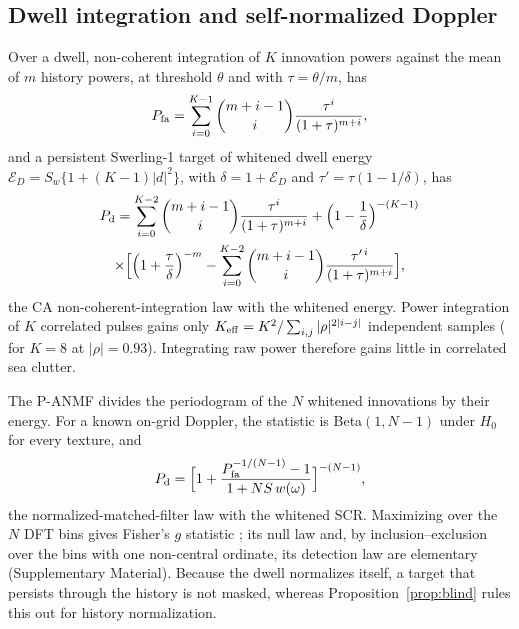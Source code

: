 \documentclass[journal]{IEEEtran}
\begin{document}
\subsection{Dwell integration and self-normalized Doppler}
Over a dwell, non-coherent integration of $K$ innovation powers against the mean of $m$ history powers, at threshold $\theta$ and with $\tau=\theta/m$, has
\begin{equation}
P_{\rm fa}=\sum_{i=0}^{K-1}\binom{m+i-1}{i}\frac{\tau^i}{(1+\tau)^{m+i}},
\label{eq:dwellpfa}
\end{equation}
and a persistent Swerling-1 target of whitened dwell energy $\mathcal E_D=S_w\{1+(K-1)|d|^2\}$, with $\delta=1+\mathcal E_D$ and $\tau'=\tau(1-1/\delta)$, has
\begin{multline}
P_{\rm d}=\sum_{i=0}^{K-2}\binom{m+i-1}{i}\frac{\tau^i}{(1+\tau)^{m+i}}+\Big(1-\frac1\delta\Big)^{-(K-1)}\\
\times\Big[\Big(1+\frac{\tau}{\delta}\Big)^{-m}-\sum_{i=0}^{K-2}\binom{m+i-1}{i}\frac{\tau'^{\,i}}{(1+\tau)^{m+i}}\Big],
\label{eq:dwellpd}
\end{multline}
the CA non-coherent-integration law \cite{gandhi1988,richards2014} with the whitened energy. Power integration of $K$ correlated pulses gains only $K_{\rm eff}=K^2/\sum_{i,j}|\rho|^{2|i-j|}$ independent samples (\ThKeff{} for $K=8$ at $|\rho|=0.93$). Integrating raw power therefore gains little in correlated sea clutter.

The P-ANMF divides the periodogram of the $N$ whitened innovations by their energy. For a known on-grid Doppler, the statistic is Beta$(1,N-1)$ under $H_0$ for every texture, and
\begin{equation}
P_{\rm d}=\Big[1+\frac{P_{\rm fa}^{-1/(N-1)}-1}{1+N S\,w(\omega)}\Big]^{-(N-1)},
\label{eq:panmf}
\end{equation}
the normalized-matched-filter law \cite{kraut1999,conte1995} with the whitened SCR. Maximizing over the $N$ DFT bins gives Fisher's $g$ statistic \cite{fisher1929g}; its null law and, by inclusion--exclusion over the bins with one non-central ordinate, its detection law are elementary (Supplementary Material). Because the dwell normalizes itself, a target that persists through the history is not masked, whereas Proposition~\ref{prop:blind} rules this out for history normalization.
\end{document}
